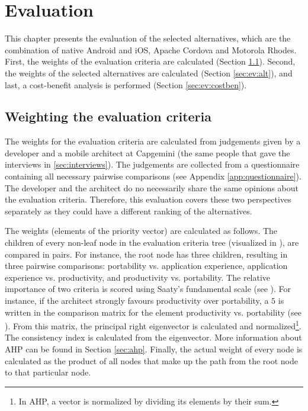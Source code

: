 \chapter{Evaluation}
\label{chap:evaluation}

This chapter presents the evaluation of the selected alternatives, which are the combination of native Android and iOS, Apache Cordova and Motorola Rhodes. First, the weights of the evaluation criteria are calculated (Section \ref{sec:ev:crit}). Second, the weights of the selected alternatives are calculated (Section \ref{sec:ev:alt}), and last, a cost-benefit analysis is performed (Section \ref{sec:ev:costben}).

\section{Weighting the evaluation criteria}
\label{sec:ev:crit}

The weights for the evaluation criteria are calculated from judgements given by a developer and a mobile architect at Capgemini (the same people that gave the interviews in \ref{sec:interviews}). The judgements are collected from a questionnaire containing all necessary pairwise comparisons (see Appendix \ref{app:questionnaire}). The developer and the architect do no necessarily share the same opinions about the evaluation criteria. Therefore, this evaluation covers these two perspectives separately as they could have a different ranking of the alternatives. 

The weights (elements of the priority vector) are calculated as follows. The children of every non-leaf node in the evaluation criteria tree (visualized in ), are compared in pairs. For instance, the root node has three children, resulting in three pairwise comparisons: portability vs. application experience, application experience vs. productivity, and productivity vs. portability. The relative importance of two criteria is scored using Saaty's fundamental scale \cite{Saaty:1980, Saaty:1990} (see ). For instance, if the architect strongly favours productivity over portability, a $5$ is written in the comparison matrix for the element productivity vs. portability (see ). From this matrix, the principal right eigenvector is calculated and normalized\footnote{In AHP, a vector is normalized by dividing its elements by their sum.}. The consistency index is calculated from the eigenvector. More information about AHP can be found in Section \ref{sec:ahp}. Finally, the actual weight of every node is calculated as the product of all nodes that make up the path from the root node to that particular node.  

